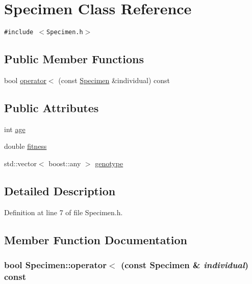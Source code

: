 \hypertarget{classSpecimen}{
\section{Specimen Class Reference}
\label{classSpecimen}
}
{\tt \#include $<$Specimen.h$>$}

\subsection*{Public Member Functions}
\begin{CompactItemize}
\item 
bool \hyperlink{classSpecimen_f2af28af7b62022ad080ed0fc679a859}{operator$<$} (const \hyperlink{classSpecimen}{Specimen} \&individual) const 
\end{CompactItemize}
\subsection*{Public Attributes}
\begin{CompactItemize}
\item 
int \hyperlink{classSpecimen_c28f8751b5461503dab079df3c9c2121}{age}
\item 
double \hyperlink{classSpecimen_14e1eefd003e8a43a6a1c743dfb5f638}{fitness}
\item 
std::vector$<$ boost::any $>$ \hyperlink{classSpecimen_3c799f53873aa03836c0650338099fbe}{genotype}
\end{CompactItemize}


\subsection{Detailed Description}


Definition at line 7 of file Specimen.h.

\subsection{Member Function Documentation}
\hypertarget{classSpecimen_f2af28af7b62022ad080ed0fc679a859}{
\subsubsection{\setlength{\rightskip}{0pt plus 5cm}bool Specimen::operator$<$ (const {\bf Specimen} \& {\em individual}) const}}
\label{classSpecimen_f2af28af7b62022ad080ed0fc679a859}




